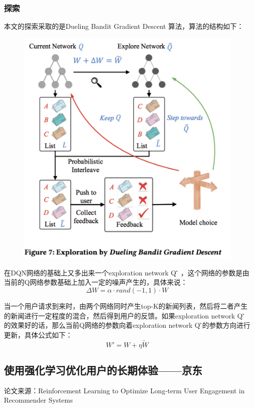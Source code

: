 \documentclass[12pt]{article}
\begin{document}
\subsubsection{探索}
本文的探索采取的是Dueling Bandit Gradient Descent 算法，算法的结构如下：
\begin{figure}[H]
    \centering
    \includegraphics[width=1\textwidth]{fig/DRN_Gradient_DBGD.png}
\end{figure}

在DQN网络的基础上又多出来一个exploration network Q ̃ ，这个网络的参数是由当前的Q网络参数基础上加入一定的噪声产生的，具体来说：
$$
\Delta W = \alpha \cdot rand(-1, 1) \cdot W
$$

当一个用户请求到来时，由两个网络同时产生top-K的新闻列表，然后将二者产生的新闻进行一定程度的混合，然后得到用户的反馈。如果exploration network Q ̃的效果好的话，那么当前Q网络的参数向着exploration network Q ̃的参数方向进行更新，具体公式如下：
$$
W' = W + \eta \tilde{W}
$$


\subsection{使用强化学习优化用户的长期体验——京东\cite{Recommender_System_With_Deep_Learning_Reinforcement_Learning}}
论文来源：Reinforcement Learning to Optimize Long-term User Engagement in Recommender Systems
\end{document}
